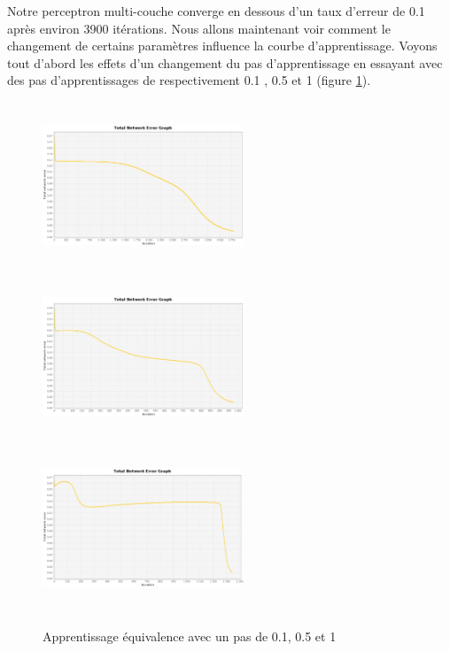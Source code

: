 \documentclass[twoside,openright,a4paper,11pt,french]{article}
\begin{document}
Notre perceptron multi-couche converge en dessous d'un taux d'erreur de 0.1
après environ 3900 itérations.
Nous allons maintenant voir comment le changement de certains paramètres
influence la courbe d'apprentissage. Voyons tout d'abord les effets d'un
changement du pas d'apprentissage en essayant avec des pas d'apprentissages de
respectivement 0.1 , 0.5 et 1 (figure \ref{fig:eqmult01051}).


\begin{figure}[ht]
\centering
\includegraphics[width=6cm,height=5cm]{./pics/eq/multi_eq_0.1.eps}
\includegraphics[width=6cm,height=5cm]{./pics/eq/multi_eq_0.5.eps}
\includegraphics[width=6cm,height=5cm]{./pics/eq/multi_eq_1.eps}
\caption{Apprentissage équivalence avec un pas de 0.1, 0.5 et 1}
\label{fig:eqmult01051}
\end{figure}
\end{document}
